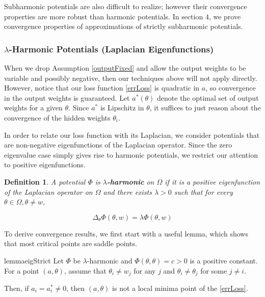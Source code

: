 \documentclass[11pt]{article}
\newtheorem{definition}[theorem]{Definition}
\begin{document}
Subharmonic potentials are also difficult to realize; however their convergence properties are more robust than harmonic potentials. In section 4, we prove convergence properties of approximations of strictly subharmonic potentials.


\subsubsection{$\lambda$-Harmonic Potentials (Laplacian Eigenfunctions)}

When we drop Assumption \ref{outputFixed} and allow the output weights to be variable and possibly negative, then our techniques above will not apply directly. However, notice that our loss function \eqref{errLoss} is quadratic in $a$, so convergence in the output weights is guaranteed. Let $a^*(\theta)$ denote the optimal set of output weights for a given $\theta$. Since $a^*$ is Lipschitz in $\theta$, it suffices to just reason about the convergence of the hidden weights $\theta_i$.

In order to relate our loss function with its Laplacian, we consider potentials that are non-negative eigenfunctions of the Laplacian operator. Since the zero eigenvalue case simply gives rise to harmonic potentials, we restrict our attention to positive eigenfunctions.

\begin{definition}
A potential $\Phi$ is {\bf$\lambda$-harmonic} on $\Omega$ if it is a positive eigenfunction of the Laplacian operator on $\Omega$ and there exists $\lambda > 0$ such that for every $\theta \in \Omega, \theta \neq w$,

\[\Delta_\theta \Phi(\theta, w) = \lambda \Phi(\theta,w) \]

\end{definition}


To derive convergence results, we first start with a useful lemma, which shows that most critical points are saddle points. 

\begin{restatable}{lemma}{eigStrict}
\label{EigStrict}
Let $\Phi$ be $\lambda$-harmonic and $\Phi(\theta,\theta) = c > 0$ is a positive constant. For a point $(a,\theta)$, assume that $\theta_i \neq w_j$ for any $j$ and $\theta_i \neq \theta_j$ for some $j \neq i$.

Then, if $a_i = a^*_i\neq 0$, then $(a,\theta)$ is not a local minima point of the \eqref{errLoss}.
\end{restatable}
\end{document}
